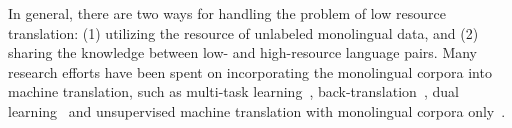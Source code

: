 In general, there are two ways for handling the problem of low resource translation: (1) utilizing the resource of unlabeled monolingual data, and (2) sharing the knowledge between low- and high-resource language pairs. Many research efforts have been spent on incorporating the monolingual corpora into machine translation, such as multi-task learning~\citep{Gulcehre-Orhan-et-al-2015,zhang2016exploiting}, back-translation~\citep{sennrich2015improving}, dual learning~\citep{he2016dual} and unsupervised machine translation with monolingual corpora only~\citep{artetxe2017unsupervised,lample2017unsupervised,yang2018unsupervised}. 

